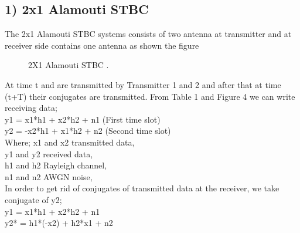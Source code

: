 \documentclass[12pt]{report}
\begin{document}
\subsection*{1) 2x1 Alamouti STBC}
The 2x1 Alamouti STBC systems consists of two antenna
at transmitter and at receiver side contains one antenna as
shown the figure
\begin{figure}[!hbt]
\begin{center}
		\caption{2X1 Alamouti STBC  .}
		\label{fig:tf_plot}
		\end{center}
	\end{figure}
At time t and are transmitted by Transmitter
1 and 2 and after that at time (t+T) their conjugates are
transmitted.
From Table 1 and Figure 4 we can write receiving data;\\
y1 = x1*h1 + x2*h2 + n1  (First time slot) \\
y2 = -x2*h1 + x1*h2 + n2  (Second time slot) \\
Where;
x1 and x2 transmitted data,\\
y1 and y2 received data,\\
h1 and h2 Rayleigh channel,\\
n1 and n2 AWGN noise,\\
In order to get rid of conjugates of transmitted data at the
receiver, we take conjugate of y2;\\
y1 = x1*h1 + x2*h2 + n1\\
y2* = h1*(-x2) + h2*x1 + n2
\end{document}
